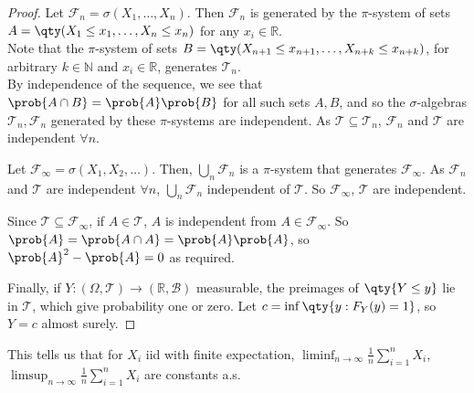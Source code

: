 \begin{proof}
	Let $\mathcal F_n = \sigma(X_1, \dots, X_n)$.
	Then $\mathcal{F}_n$ is generated by the $\pi$-system of sets $A = \qty(X_1 \leq x_1, \dots, X_n \leq x_n)$ for any $x_i \in \mathbb R$. \\
	Note that the $\pi$-system of sets $B = \qty(X_{n+1} \leq x_{n+1}, \dots, X_{n+k} \leq x_{n+k})$, for arbitrary $k \in \mathbb N$ and $x_i \in \mathbb R$, generates $\mathcal T_n$. \\
	By independence of the sequence, we see that $\prob{A \cap B} = \prob{A} \prob{B}$ for all such sets $A, B$, and so the $\sigma$-algebras $\mathcal T_n, \mathcal F_n$ generated by these $\pi$-systems are independent.
	As $\mathcal{T} \subseteq \mathcal{T}_n$, $\mathcal{F}_n$ and $\mathcal{T}$ are independent $\forall n$.

	Let $\mathcal F_\infty = \sigma(X_1, X_2, \dots)$.
	Then, $\bigcup_n \mathcal F_n$ is a $\pi$-system that generates $\mathcal F_\infty$.
	As $\mathcal{F}_n$ and $\mathcal{T}$ are independent $\forall n$, $\bigcup_n \mathcal F_n$ independent of $\mathcal{T}$.
	So $\mathcal{F}_\infty$, $\mathcal{T}$ are independent.

	Since $\mathcal T \subseteq \mathcal F_\infty$, if $A \in \mathcal T$, $A$ is independent from $A \in \mathcal{F}_\infty$.
	So $\prob{A} = \prob{A \cap A} = \prob{A}\prob{A}$, so $\prob{A}^2 - \prob{A} = 0$ as required.

	Finally, if $Y \colon (\Omega,\mathcal T) \to (\mathbb R,\mathcal B)$ measurable, the preimages of $\qty{Y \leq y}$ lie in $\mathcal T$, which give probability one or zero.
	Let $c = \inf\qty{y : F_Y(y) = 1}$, so $Y = c$ almost surely.
\end{proof}


\begin{remark}
	This tells us that for $X_i$ iid with finite expectation, $\liminf_{n \to \infty} \frac{1}{n} \sum_{i=1}^{n} X_i$, $\limsup_{n \to \infty} \frac{1}{n} \sum_{i=1}^{n} X_i$ are constants a.s.
\end{remark}